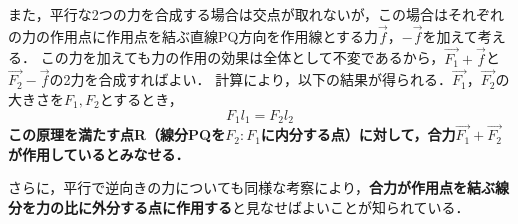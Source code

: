 また，平行な2つの力を合成する場合は交点が取れないが，この場合はそれぞれの力の作用点に作用点を結ぶ直線PQ方向を作用線とする力$\overrightarrow{f}$，$-\overrightarrow{f}$を加えて考える．
この力を加えても力の作用の効果は全体として不変であるから，$\overrightarrow{F_1}+\overrightarrow{f}$と$\overrightarrow{F_2}-\overrightarrow{f}$の2力を合成すればよい．
計算により，以下の結果が得られる．$\overrightarrow{F_1}$，$\overrightarrow{F_2}$の大きさを$F_1,F_2$とするとき，
\[ F_1l_1=F_2l_2\]
{\bf この原理を満たす点R（線分PQを}\mbox{\boldmath $F_2:F_1$}{\bf に内分する点）に対して，合力}\mbox{\boldmath $\overrightarrow{F_1}+\overrightarrow{F_2}$}{\bf が作用しているとみなせる．}

さらに，平行で逆向きの力についても同様な考察により，{\bf 合力が作用点を結ぶ線分を力の比に外分する点に作用する}と見なせばよいことが知られている．


